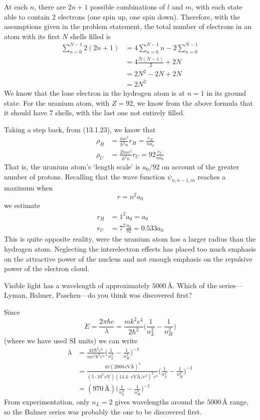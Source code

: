 \documentclass[../principles-of-quantum-mechanics.tex]{subfiles}
\begin{document}
\begin{questions}
	\begin{solution}
		At each $n$, there are $2n + 1$ possible combinations of $l$ and $m$, with each state able to contain $2$ electrons (one spin up, one spin down). Therefore, with the assumptions given in the problem statement, the total number of electrons in an atom with its first $N$ shells filled is
		\begin{align*}
			\sum_{n=0}^{N - 1}2(2n + 1) &= 4\sum_{n=0}^{N-1}n - 2\sum_{n=0}^{N-1} \\
			&= 4\frac{N(N - 1)}{2} + 2N \\
			&= 2N^2 - 2N + 2N \\
			&= 2N^2
		\end{align*}
		We know that the lone electron in the hydrogen atom is at $n = 1$ in its ground state. For the uranium atom, with $Z = 92$, we know from the above formula that it should have $7$ shells, with the last one not entirely filled. 
		
		Taking a step back, from (13.1.23), we know that
		\begin{align*}
			\rho_H &= \frac{me^2}{\hbar^2n}r_H = \frac{r_H}{na_0} \\
			\rho_U &= \frac{Zme^2}{\hbar^2n}r_U = 92\frac{r_U}{na_0}
		\end{align*}
		That is, the uranium atom's `length scale' is $a_0/92$ on account of the greater number of protons. Recalling that the wave function $\psi_{n,n-1,m}$ reaches a maximum when 
		$$r = n^2a_0$$
		we estimate
		\begin{align*}
			r_H &= 1^2a_0 = a_0 \\
			r_U &= 7^2\frac{a_0}{92} = 0.533a_0
		\end{align*}
		This is quite opposite reality, were the uranium atom has a larger radius than the hydrogen atom. Neglecting the interelectron effects has placed too much emphasis on the attractive power of the nucleus and not enough emphasis on the repulsive power of the electron cloud.
	\end{solution}
	
	\question Visible light has a wavelength of approximately $5000\,\text{\AA}$. Which of the series---Lyman, Balmer, Paschen---do you think was discovered first?
	
	\begin{solution}
		Since
		$$E = \frac{2\pi\hbar c}{\lambda} = \frac{mk^2e^4}{2\hbar^2}\Big(\frac{1}{n_L^2} - \frac{1}{n_H^2}\Big)$$
		(where we have used SI units) we can write
		\begin{align*}
			\lambda &= \frac{4\pi\hbar^3c^3}{mc^2k^2e^4}\Big(\frac{1}{n_L^2} - \frac{1}{n_H^2}\Big)^{-1} \\
			&= \frac{4\pi(2000\,\text{eV\AA})^3}{(5\cdot10^5\,\text{eV})(14.4\cdot\text{eV\AA}/e^2)^2e^4}\Big(\frac{1}{n_L^2} - \frac{1}{n_H^2}\Big)^{-1} \\
			&= (970\,\text{\AA})\Big(\frac{1}{n_L^2} - \frac{1}{n_H^2}\Big)^{-1}
		\end{align*}
		From experimentation, only $n_L=2$ gives wavelengths around the $5000\,\text{\AA}$ range, so the Balmer series was probably the one to be discovered first.
	\end{solution}
	
	\end{questions}
\end{document}
